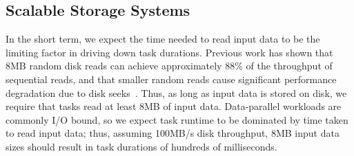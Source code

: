 





\subsection{Scalable Storage Systems}

In the short term, we expect the time needed to read input data to be the
limiting factor in driving down task durations.
Previous work has shown that 8MB random disk reads can achieve approximately 88\%
of the throughput of sequential reads, and that smaller
random reads cause significant performance degradation due to disk seeks~\cite{nightingale2012flat}. Thus, as long as input data is stored on disk, we
require that tasks read at least 8MB of input data. Data-parallel
workloads are commonly I/O bound, so we expect task runtime to be dominated
by time taken to read input data; thus,
assuming 100MB/s disk throughput, 8MB input data sizes should result in task durations
of hundreds of milliseconds.

